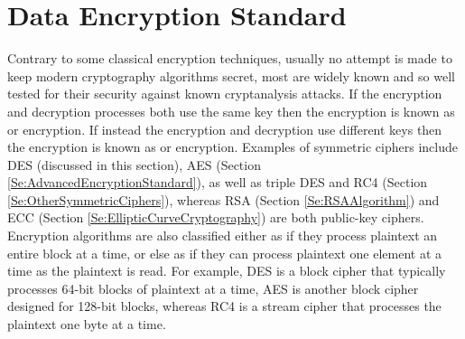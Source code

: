 
\section{Data Encryption Standard}\label{Se:DataEncryptionStandard}


Contrary to some classical encryption techniques, usually no attempt is made to
keep modern cryptography algorithms secret, most are widely known and so
well tested for their security against known cryptanalysis attacks.
If the encryption and decryption processes both use the same key then the
encryption is known as  or  encryption.
If instead the encryption and decryption use different keys then the
encryption is known as  or  encryption.
Examples of symmetric ciphers include DES
(discussed in this section),
AES (Section \ref{Se:AdvancedEncryptionStandard}),
as well as triple DES and RC4 (Section \ref{Se:OtherSymmetricCiphers}),
whereas RSA (Section \ref{Se:RSAAlgorithm}) and
ECC (Section \ref{Se:EllipticCurveCryptography}) are both public-key ciphers.
Encryption algorithms are also classified either as 
if they process plaintext an entire block at a time, or else as 
if they can process plaintext one element at a time as the plaintext is read.
For example, DES is a block cipher that typically processes 64-bit blocks of plaintext
at a time, AES is another block cipher designed for 128-bit blocks, whereas
RC4 is a stream cipher that processes the plaintext one byte at a time.

